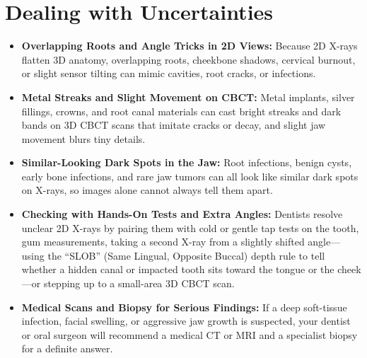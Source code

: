 \section{Dealing with Uncertainties}
\begin{itemize}
\item \textbf{Overlapping Roots and Angle Tricks in 2D Views:} Because 2D X-rays flatten 3D anatomy, overlapping roots, cheekbone shadows, cervical burnout, or slight sensor tilting can mimic cavities, root cracks, or infections.
\item \textbf{Metal Streaks and Slight Movement on CBCT:} Metal implants, silver fillings, crowns, and root canal materials can cast bright streaks and dark bands on 3D CBCT scans that imitate cracks or decay, and slight jaw movement blurs tiny details.
\item \textbf{Similar-Looking Dark Spots in the Jaw:} Root infections, benign cysts, early bone infections, and rare jaw tumors can all look like similar dark spots on X-rays, so images alone cannot always tell them apart.
\item \textbf{Checking with Hands-On Tests and Extra Angles:} Dentists resolve unclear 2D X-rays by pairing them with cold or gentle tap tests on the tooth, gum measurements, taking a second X-ray from a slightly shifted angle---using the ``SLOB'' (Same Lingual, Opposite Buccal) depth rule to tell whether a hidden canal or impacted tooth sits toward the tongue or the cheek---or stepping up to a small-area 3D CBCT scan.
\item \textbf{Medical Scans and Biopsy for Serious Findings:} If a deep soft-tissue infection, facial swelling, or aggressive jaw growth is suspected, your dentist or oral surgeon will recommend a medical CT or MRI and a specialist biopsy for a definite answer.
\end{itemize}

